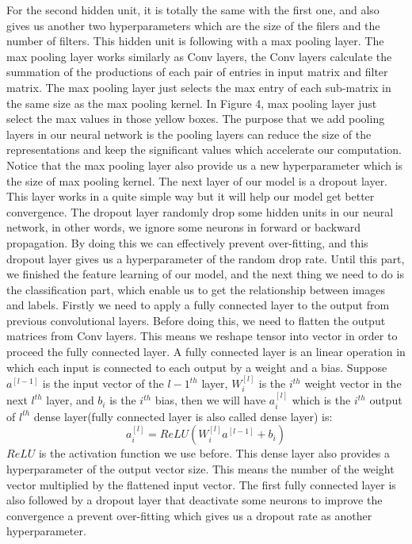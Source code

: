 \documentclass[12pt]{article}
\begin{document}
For the second hidden unit, it is totally the same with the first one, and also gives us another two hyperparameters which are the size of the filers and the number of filters. This hidden unit is following with a max pooling layer. The max pooling layer works similarly as Conv layers, the Conv layers calculate the summation of the productions of each pair of entries in input matrix and filter matrix. The max pooling layer just selects the max entry of each sub-matrix in the same size as the max pooling kernel. In Figure 4, max pooling layer just select the max values in those yellow boxes. The purpose that we add pooling layers in our neural network is the pooling layers can reduce the size of the representations and keep the significant values which accelerate our computation. Notice that the max pooling layer also provide us a new hyperparameter which is the size of max pooling kernel. The next layer of our model is a dropout layer. This layer works in a quite simple way but it will help our model get better convergence. The dropout layer randomly drop some hidden units in our neural network, in other words, we ignore some neurons in forward or backward propagation. By doing this we can effectively prevent over-fitting, and this dropout layer gives us a hyperparameter of the random drop rate. Until this part, we finished the feature learning of our model, and the next thing we need to do is the classification part, which enable us to get the relationship between images and labels. Firstly we need to apply a fully connected layer to the output from previous convolutional layers. Before doing this, we need to flatten the output matrices from Conv layers. This means we reshape tensor into vector in order to proceed the fully connected layer. A fully connected layer is an linear operation in which each input is connected to each output by a weight and a bias. Suppose $a^{[l-1]}$ is the  input vector of the $l-1^{th}$ layer, $W^{[l]}_i$ is the $i^{th}$ weight vector in the next $l^{th}$ layer, and $b_i$ is the $i^{th}$ bias, then we will have $a^{[l]}_i$ which is the $i^{th}$ output of $l^{th}$ dense layer(fully connected layer is also called dense layer) is:
$$a^{[l]}_i = ReLU(W^{[l]}_i a^{[l-1]} + b_i)$$
$ReLU$ is the activation function we use before. This dense layer also provides a hyperparameter of the output vector size. This means the number of the weight vector multiplied by the flattened input vector. The first fully connected layer is also followed by a dropout layer that deactivate some neurons to improve the convergence a prevent over-fitting which gives us a dropout rate as another hyperparameter. \\
\end{document}
